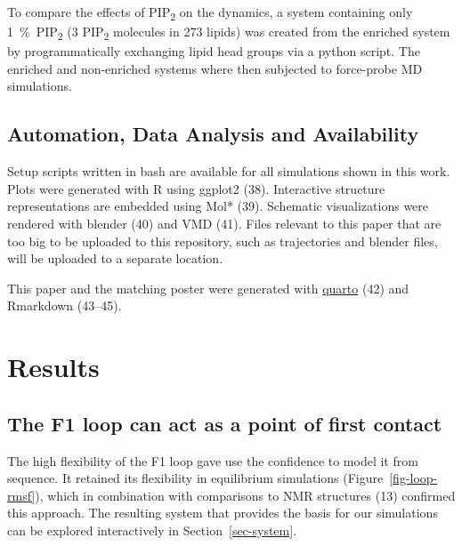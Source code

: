 \documentclass[
  letterpaper,
  DIV=11,
  numbers=noendperiod]{scrartcl}
\begin{document}
To compare the effects of PIP\textsubscript{2} on the dynamics, a system
containing only 1~\%~PIP\textsubscript{2} (3 PIP\textsubscript{2}
molecules in 273 lipids) was created from the enriched system by
programmatically exchanging lipid head groups via a python script. The
enriched and non-enriched systems where then subjected to force-probe MD
simulations.

\hypertarget{automation-data-analysis-and-availability}{%
\subsection{Automation, Data Analysis and
Availability}\label{automation-data-analysis-and-availability}}

Setup scripts written in bash are available for all simulations shown in
this work. Plots were generated with R using ggplot2 (38). Interactive
structure representations are embedded using Mol* (39). Schematic
visualizations were rendered with blender (40) and VMD (41). Files
relevant to this paper that are too big to be uploaded to this
repository, such as trajectories and blender files, will be uploaded to
a separate location.

This paper and the matching poster were generated with
\href{https://quarto.org/}{quarto} (42) and Rmarkdown (43--45).

\hypertarget{results}{%
\section{Results}\label{results}}

\hypertarget{the-f1-loop-can-act-as-a-point-of-first-contact}{%
\subsection{The F1 loop can act as a point of first
contact}\label{the-f1-loop-can-act-as-a-point-of-first-contact}}

The high flexibility of the F1 loop gave use the confidence to model it
from sequence. It retained its flexibility in equilibrium simulations
(Figure~\ref{fig-loop-rmsf}), which in combination with comparisons to
NMR structures (13) confirmed this approach. The resulting system that
provides the basis for our simulations can be explored interactively in
Section~\ref{sec-system}.
\end{document}
